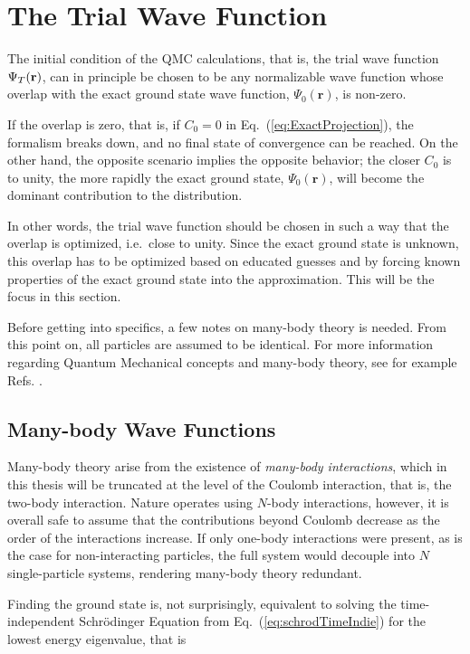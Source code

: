 \section{The Trial Wave Function}
\label{sec:trialWF}

The initial condition of the QMC calculations, that is, the trial wave function $\Psi_T(\mathbf{r})$, can in principle be chosen to be any normalizable wave function whose overlap with the exact ground state wave function, $\Psi_0(\mathbf{r})$, is non-zero. 

If the overlap is zero, that is, if $C_0=0$ in Eq.~(\ref{eq:ExactProjection}), the formalism breaks down, and no final state of convergence can be reached. On the other hand, the opposite scenario implies the opposite behavior; the closer $C_0$ is to unity, the more rapidly the exact ground state, $\Psi_0(\mathbf{r})$, will become the dominant contribution to the distribution. 

In other words, the trial wave function should be chosen in such a way that the overlap is optimized, i.e.~close to unity. Since the exact ground state is unknown, this overlap has to be optimized based on educated guesses and by forcing known properties of the exact ground state into the approximation. This will be the focus in this section.  

Before getting into specifics, a few notes on many-body theory is needed. From this point on, all particles are assumed to be identical. For more information regarding Quantum Mechanical concepts and many-body theory, see for example Refs. \cite{griffiths, Sakurai:94, Shavitt}. 

\subsection{Many-body Wave Functions}
\label{sec:manyBodyWFs}

Many-body theory arise from the existence of \textit{many-body interactions}, which in this thesis will be truncated at the level of the Coulomb interaction, that is, the two-body interaction. Nature operates using  $N$-body interactions, however, it is overall safe to assume that the contributions beyond Coulomb decrease as the order of the interactions increase. If only one-body interactions were present, as is the case for non-interacting particles, the full system would decouple into $N$ single-particle systems, rendering many-body theory redundant.

Finding the ground state is, not surprisingly, equivalent to solving the time-independent Schrödinger Equation from Eq.~(\ref{eq:schrodTimeIndie}) for the lowest energy eigenvalue, that is

